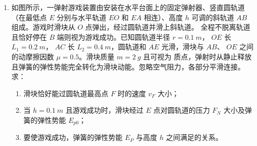 \begin{enumerate}
\item
如图所示，一弹射游戏装置由安装在水平台面上的固定弹射器、竖直圆轨道（在最低点 $ E $ 分别与水平轨道 $ EO $ 和 $ EA $ 相连）、高度 $ h $ 可调的斜轨道 $ AB $ 组成。游戏时滑块从 $ O $ 点弹出，经过圆轨道并滑上斜轨道。
全程不脱离轨道且恰好停在 $ B $ 端则视为游戏成功。已知圆轨道半径 $ r=0.1 \ m $， $ OE $ 长 $ L_{1} =0.2 \ m $， $ AC $ 长
$ L_{2} =0.4 \ m $，圆轨道和 $ AE $ 光滑，滑块与 $ AB $、 $ OE $ 之间的动摩擦因数 $ \mu=0.5 $。滑块质量 $ m=2 \ g $ 且可视为
质点，弹射时从静止释放且弹簧的弹性势能完全转化为滑块动能。忽略空气阻力，各部分平滑连接。求：
\begin{enumerate}
\item
滑块恰好能过圆轨道最高点 $ F $ 时的速度 $ v_F $ 大小；
\item 
当 $ h=0.1 \ m $ 且游戏成功时，滑块经过 $ E $ 点对圆轨道的压力 $ F_{N} $ 大小及弹簧的弹性势能 $ E_{p0} $；
\item 
要使游戏成功，弹簧的弹性势能 $ E_{P} $ 与高度 $ h $ 之间满足的关系。

\end{enumerate}
\begin{figure}[h!]
\flushright

\end{figure}






\end{enumerate}
